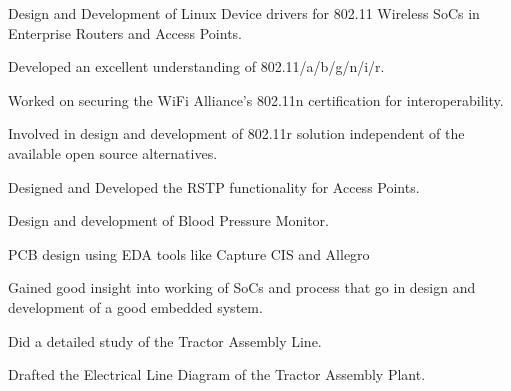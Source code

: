 \documentclass[letterpaper]{deedy-resume} %
\begin{document}
\begin{minipage}[t]{0.66\textwidth}
\begin{tightitemize}
\item Design and Development of Linux Device drivers for 802.11 Wireless SoCs in Enterprise Routers and Access Points.
\item Developed an excellent understanding of 802.11/a/b/g/n/i/r.
\item Worked on securing the WiFi Alliance's 802.11n certification for interoperability.
\item Involved in design and development of 802.11r solution independent of the available open source alternatives.
\item Designed and Developed the RSTP functionality for Access Points.
\end{tightitemize}

\sectionspace %



\begin{tightitemize}
\item Design and development of Blood Pressure Monitor.
\item PCB design using EDA tools like Capture CIS and Allegro
\item Gained good insight into working of SoCs and process that go in design and development of a good embedded system.
\end{tightitemize}

\sectionspace %



\begin{tightitemize}
\item Did a detailed study of the Tractor Assembly Line.
\item Drafted the Electrical Line Diagram of the Tractor Assembly Plant.
\end{tightitemize}

\sectionspace %



\end{minipage}
\end{document}
